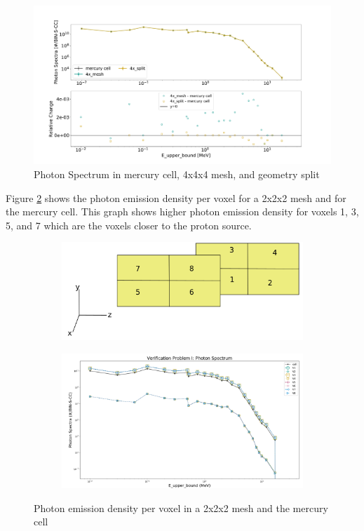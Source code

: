 \begin{figure}[H]
 \centering
 \includegraphics[scale=0.42,trim={2cm 0.5cm 3cm 2cm},clip]{../figs/toy_p1/spec_VPI_4x.pdf}
 \caption{Photon Spectrum in mercury cell, 4x4x4 mesh, and geometry split}
 \label{fig:1spec_cell_4x}
\end{figure}
%
Figure \ref{fig:1spec_8v} shows the photon emission density per voxel for a
2x2x2 mesh and for the mercury cell. This graph shows higher photon emission
density for voxels 1, 3, 5, and 7 which are the voxels closer to the proton
source.
\begin{figure}[H]
	\begin{subfigure}[t]{1.0\textwidth}
		\hfill
		\includegraphics[scale=0.4, trim={0cm 0cm 0cm 0cm},clip]{../figs/voxels.png}
	\end{subfigure}\hfill
	\begin{subfigure}[t]{1.0\textwidth}
		\centering
		\includegraphics[scale=0.4, trim={1cm 0cm 0.5cm 1.25cm},clip]{../figs/toy_p1/spec_VPI_8.png}
	\end{subfigure}
	\caption{Photon emission density per voxel in a 2x2x2 mesh and the mercury cell}
	\label{fig:1spec_8v}
\end{figure}
